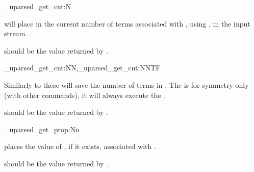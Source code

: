 \documentclass[10pt]{article}
\begin{document}
\begin{codedescribe}[code,EXP,new=2023/11/28,update=2025/12/08]{\starray_uparsed_get_cnt:N}
\begin{codesyntax}%
\end{codesyntax}
 will place in the current number of terms associated with ,  using , in the input stream.
\end{codedescribe}
\begin{tsremark}
 should be the value returned by  .
\end{tsremark}

\begin{codedescribe}[code,new=2025/10/25,update=2025/12/08]{\starray_uparsed_get_cnt:NN,\starray_uparsed_get_cnt:NNTF}
\begin{codesyntax}%
\end{codesyntax}
Similarly to  these will save  the number of terms in .  The   is  for symmetry only (with other commands), it will always execute the  .
\end{codedescribe}
\begin{tsremark}
 should be the value returned by  .
\end{tsremark}



\begin{codedescribe}[code,EXP,new=2023/11/28,update=2025/12/08]{\starray_uparsed_get_prop:Nn}
\begin{codesyntax}%
\end{codesyntax}
 places the value of , if it exists, associated with .
\end{codedescribe}
\begin{tsremark}
 should be the value returned by  .
\end{tsremark}
\end{document}
